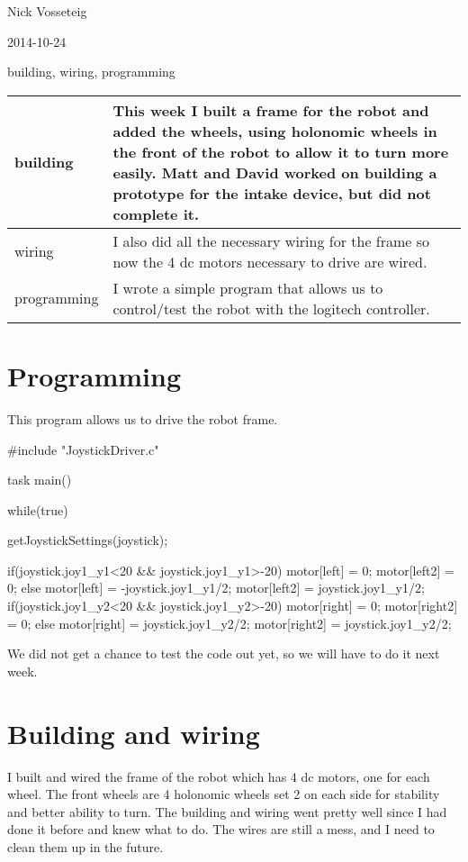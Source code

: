 \usepackage{listings}

Nick Vosseteig

2014-10-24

building, wiring, programming

\begin{tabular}{|p{5cm}|p{5cm}|}
 \hline
 building&
This week I built a frame for the robot and added the wheels, using holonomic wheels in the front of the robot to allow it to turn more easily. Matt and David worked on building a prototype for the intake device, but did not complete it. 
 \\
 \hline
wiring&
I also did all the necessary wiring for the frame so now the 4 dc motors necessary to drive are wired.
 \\
 \hline
programming& I wrote a simple program that allows us to control/test the robot with the logitech controller.
 \\
 \hline
\end{tabular}

\section*{Programming}
This program allows us to drive the robot frame.
\begin{listing}	
#include "JoystickDriver.c"

task main()
{
	while(true)
	{
		getJoystickSettings(joystick);

		if(joystick.joy1_y1<20 && joystick.joy1_y1>-20){
			motor[left] = 0;
			motor[left2] = 0;
			}else{
			motor[left] = -joystick.joy1_y1/2;
			motor[left2] = joystick.joy1_y1/2;
		}
		if(joystick.joy1_y2<20 && joystick.joy1_y2>-20){
			motor[right] = 0;
			motor[right2] = 0;
			}else{
			motor[right] = joystick.joy1_y2/2;
			motor[right2] = joystick.joy1_y2/2;
		}
	}
}
\end{listing}
We did not get a chance to test the code out yet, so we will have to do it next week.

\section*{Building and wiring}
I built and wired the frame of the robot which has 4 dc motors, one for each wheel. The front wheels are 4 holonomic wheels set 2 on each side for stability and better ability to turn. The building and wiring went pretty well since I had done it before and knew what to do. The wires are still a mess, and I need to clean them up in the future.
